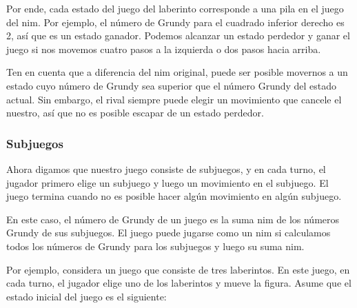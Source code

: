 Por ende, cada estado del juego del laberinto corresponde a una pila en
el juego del nim. Por ejemplo, el número de Grundy para el cuadrado
inferior derecho es 2, así que es un estado ganador. Podemos alcanzar un
estado perdedor y ganar el juego si nos movemos cuatro pasos a la izquierda
o dos pasos hacia arriba.

Ten en cuenta que a diferencia del nim original, puede ser posible
movernos a un estado cuyo número de Grundy sea superior que el número
Grundy del estado actual. Sin embargo, el rival siempre puede elegir un
movimiento que cancele el nuestro, así que no es posible escapar de un
estado perdedor.

\subsubsection{Subjuegos}

Ahora digamos que nuestro juego consiste de subjuegos, y en cada turno,
el jugador primero elige un subjuego y luego un movimiento en el subjuego.
El juego termina cuando no es posible hacer algún movimiento en algún
subjuego.

En este caso, el número de Grundy de un juego es la suma nim de los números
Grundy de sus subjuegos. El juego puede jugarse como un nim si
calculamos todos los números de Grundy para los subjuegos y luego su suma nim.

Por ejemplo, considera un juego que consiste de tres laberintos. En este
juego, en cada turno, el jugador elige uno de los laberintos y mueve
la figura. Asume que el estado inicial del juego es el siguiente:

